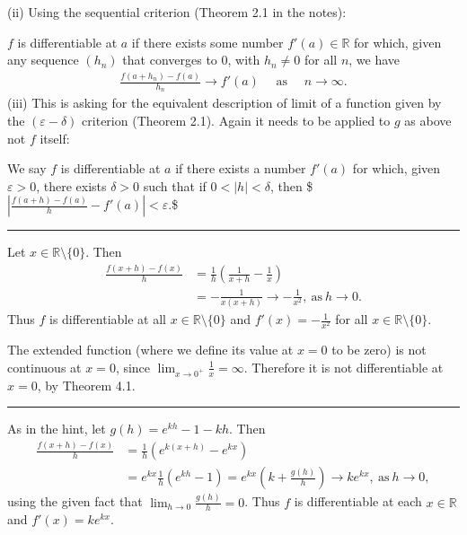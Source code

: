 \documentclass[letterpaper,10pt,english]{jupyterBook}
\begin{document}
\sphinxAtStartPar
(ii) Using the sequential criterion (Theorem 2.1 in the notes):

\(f\) is differentiable at \(a\) if there exists some number \(f'(a) \in \mathbb{R}\) for which, given any sequence \((h_{n})\) that converges to \(0\), with \(h_n\neq 0\) for all \(n\), we have
\begin{equation*}
\begin{split}
\frac{f(a + h_{n}) - f(a)}{h_{n}} \rightarrow f'(a) \hspace{1em} \text{ as } \hspace{1em} n\rightarrow\infty.
\end{split}
\end{equation*}
\sphinxAtStartPar
(iii) This is asking for the equivalent description of limit of a function given by the \((\varepsilon - \delta)\) criterion (Theorem 2.1). Again it needs to be applied to \(g\) as above not \(f\) itself:

We say \(f\) is differentiable at \(a\) if there exists a number \(f'(a)\) for which, given \(\varepsilon>0\), there exists \(\delta > 0\) such that if \(0<|h| < \delta\), then 	
\$\(
\left|\displaystyle\frac{f(a+h) - f(a)}{h} - f'(a)\right| < \varepsilon.
\)\$


\bigskip\hrule\bigskip


\sphinxAtStartPar
{\hyperref[\detokenize{Problems:id39}]{}} Let \(x\in\mathbb{R}\setminus\{0\}\). Then
\begin{align*}
\frac{f(x + h) -f(x)}{h} &= \frac{1}{h}\left(\frac{1}{x+ h} -\frac{1}{x}\right)\\
&= -\frac{1}{x(x+h)} \rightarrow -\frac{1}{x^{2}},~\mbox{as}~h \rightarrow 0. 
\end{align*}
\sphinxAtStartPar
Thus \(f\) is differentiable at all \(x\in\mathbb{R}\setminus\{0\}\) and \(f'(x)=-\frac{1}{x^2}\) for all \(x\in\mathbb{R}\setminus\{0\}\).

The extended function (where we define its value at \(x=0\) to be zero) is not continuous at \(x=0\), since \(\lim_{x \rightarrow 0^+}\frac{1}{x} =\infty\). Therefore it is not differentiable at \(x=0\), by Theorem 4.1.


\bigskip\hrule\bigskip


\sphinxAtStartPar
{\hyperref[\detokenize{Problems:id40}]{}} As in the hint, let \(g(h) = e^{kh} - 1 - kh \). Then
\begin{align*}
\frac{f(x + h) -f(x)}{h} &= \frac{1}{h}(e^{k(x +h)} - e^{kx})\\
&= e^{kx}\frac{1}{h}(e^{kh} - 1) = e^{kx}\left(k + \frac{g(h)}{h}\right) \rightarrow ke^{kx},~\mbox{as}~h \rightarrow 0,
\end{align*}
\sphinxAtStartPar
using the given fact that  \(\lim_{h \rightarrow 0}\frac{g(h)}{h} = 0\). Thus \(f\) is differentiable at each \(x\in\mathbb{R}\) and \(f'(x)=ke^{kx}\).
\end{document}
